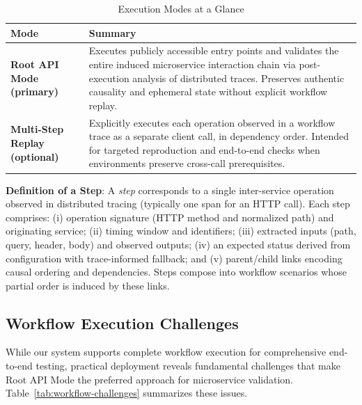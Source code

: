 \documentclass[conference]{IEEEtran}
\begin{document}
\begin{table}[t]
\centering
\caption{Execution Modes at a Glance}
\label{tab:exec-modes}
\renewcommand{\arraystretch}{1.15}\setlength{\tabcolsep}{4pt}
\begin{tabularx}{\columnwidth}{>{\bfseries}p{} X}
\toprule
Mode & Summary \\
\midrule
Root API Mode (primary) & Executes publicly accessible entry points and validates the entire induced microservice interaction chain via post-execution analysis of distributed traces. Preserves authentic causality and ephemeral state without explicit workflow replay. \\
Multi-Step Replay (optional) & Explicitly executes each operation observed in a workflow trace as a separate client call, in dependency order. Intended for targeted reproduction and end-to-end checks when environments preserve cross-call prerequisites. \\
\bottomrule
\end{tabularx}
\end{table}

\textbf{Definition of a Step}:
A \emph{step} corresponds to a single inter-service operation observed in distributed tracing (typically one span for an HTTP call). Each step comprises: (i) operation signature (HTTP method and normalized path) and originating service; (ii) timing window and identifiers; (iii) extracted inputs (path, query, header, body) and observed outputs; (iv) an expected status derived from configuration with trace-informed fallback; and (v) parent/child links encoding causal ordering and dependencies. Steps compose into workflow scenarios whose partial order is induced by these links.

\subsection{Workflow Execution Challenges}\label{ssec:workflow-challenges}
While our system supports complete workflow execution for comprehensive end-to-end testing, practical deployment reveals fundamental challenges that make Root API Mode the preferred approach for microservice validation. Table~\ref{tab:workflow-challenges} summarizes these issues.
\end{document}
